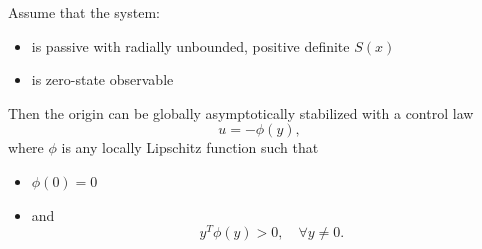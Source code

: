 Assume that the system:
\begin{itemize}
    \item is passive with radially unbounded, positive definite $S(x)$
    \item is zero-state observable
\end{itemize}
\newpar{}
Then the origin can be globally asymptotically stabilized with a control law
\begin{equation*}
    u = -\phi(y),
\end{equation*}
where $\phi$ is any locally Lipschitz function such that
\begin{itemize}
    \item $\phi(0) = 0$
    \item and
          \begin{equation*}
              y^T \phi(y) > 0, \quad \forall y \neq 0.
          \end{equation*}
\end{itemize}

